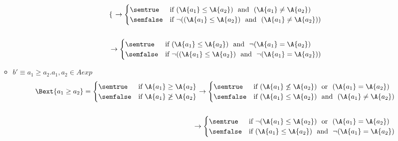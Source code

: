 \begin{enumerate}[label=(\alph*)]
\begin{itemize}
\begin{align*}
\begin{cases}
        \end{cases}
        \rightarrow
        \begin{cases} 
        \semtrue & 
        \mbox{if} \ (\A{a_1} \leq \A{a_2}) \ \mbox{ and } \ (\A{a_1} \not =  \A{a_2})\\ 
        \semfalse & 
        \mbox{if} \ \lnot ((\A{a_1} \leq \A{a_2}) \ \mbox{ and } \ (\A{a_1} \not =  \A{a_2}))\\
        \end{cases} \\ \\
        \rightarrow
        \begin{cases} 
        \semtrue & 
        \mbox{if} \ (\A{a_1} \leq \A{a_2}) \ \mbox{ and } \ \lnot (\A{a_1} =  \A{a_2})\\ 
        \semfalse & 
        \mbox{if} \ \lnot ((\A{a_1} \leq \A{a_2}) \ \mbox{ and } \ \lnot (\A{a_1} = \A{a_2}))\\
        \end{cases}
      \end{align*} 
    \item $ b' \equiv a_1 \geq a_2. a_1, a_2 \in Aexp $ \\
    \begin{align*}
      \Bext{a_1 \geq a_2} = 
      \begin{cases} 
      \semtrue & 
      \mbox{if} \ \A{a_1} \geq \A{a_2}\\ 
      \semfalse & 
      \mbox{if} \ \A{a_1} \not \geq \A{a_2}\\
      \end{cases} 
      \rightarrow
      \begin{cases} 
      \semtrue & 
      \mbox{if} \ (\A{a_1} \not \leq \A{a_2})  \ \mbox{ or } \ (\A{a_1} = \A{a_2})\\ 
      \semfalse & 
      \mbox{if} \  (\A{a_1} \leq \A{a_2})  \ \mbox{ and } \ (\A{a_1} \not = \A{a_2})\\
      \end{cases} \\ \\
      \rightarrow
      \begin{cases} 
      \semtrue & 
      \mbox{if} \ \lnot (\A{a_1} \leq \A{a_2})  \ \mbox{ or } \ (\A{a_1} = \A{a_2})\\ 
      \semfalse & 
      \mbox{if} \  (\A{a_1} \leq \A{a_2})  \ \mbox{ and } \ \lnot (\A{a_1} = \A{a_2})\\
      \end{cases} \\ \\ 

\end{align*}
\end{itemize}
\end{enumerate}
